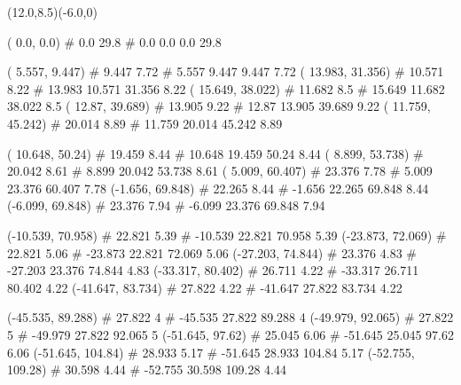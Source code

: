 \documentclass[a4paper,openbib,10pt]{article}
\newenvironment{treegraph}{\begin{graph}}{\end{graph}}
\begin{document}
\centering
\begin{treegraph}(12.0,8.5)(-6.0,0)

  \setlength{\unitlength}{1.0mm}

    
  ( 0.0, 0.0) #     0.0    29.8
   #    0.0    0.0    0.0    29.8

  ( 5.557, 9.447) #     9.447    7.72
   #    5.557    9.447    9.447    7.72
  ( 13.983, 31.356) #     10.571    8.22
   #    13.983    10.571    31.356    8.22
  ( 15.649, 38.022) #     11.682    8.5
   #    15.649    11.682    38.022    8.5
  ( 12.87, 39.689) #     13.905    9.22
   #    12.87    13.905    39.689    9.22
  ( 11.759, 45.242) #     20.014    8.89
   #    11.759    20.014    45.242    8.89

  ( 10.648, 50.24) #     19.459    8.44
   #    10.648    19.459    50.24    8.44
  ( 8.899, 53.738) #     20.042    8.61
   #    8.899    20.042    53.738    8.61
  ( 5.009, 60.407) #     23.376    7.78
   #    5.009    23.376    60.407    7.78
  (-1.656, 69.848) #     22.265    8.44
   #    -1.656    22.265    69.848    8.44
  (-6.099, 69.848) #     23.376    7.94
   #    -6.099    23.376    69.848    7.94

  (-10.539, 70.958) #     22.821    5.39
   #    -10.539    22.821    70.958    5.39
  (-23.873, 72.069) #     22.821    5.06
   #    -23.873    22.821    72.069    5.06
  (-27.203, 74.844) #     23.376    4.83
   #    -27.203    23.376    74.844    4.83
  (-33.317, 80.402) #     26.711    4.22
   #    -33.317    26.711    80.402    4.22
  (-41.647, 83.734) #     27.822    4.22
   #    -41.647    27.822    83.734    4.22

  (-45.535, 89.288) #     27.822    4
   #    -45.535    27.822    89.288    4
  (-49.979, 92.065) #     27.822    5
   #    -49.979    27.822    92.065    5
  (-51.645, 97.62) #     25.045    6.06
   #    -51.645    25.045    97.62    6.06
  (-51.645, 104.84) #     28.933    5.17
   #    -51.645    28.933    104.84    5.17
  (-52.755, 109.28) #     30.598    4.44
   #    -52.755    30.598    109.28    4.44


\end{treegraph}
\end{document}
